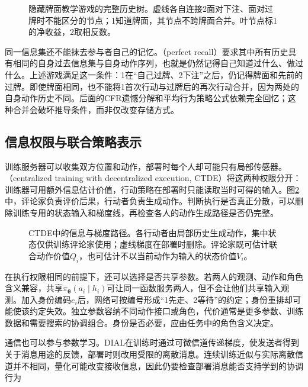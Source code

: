 \begin{figure}[htbp]
 \centering
 
 \caption{隐藏牌面教学游戏的完整历史树。虚线各自连接2面对下注、面对过牌时不能区分的节点；1知道牌面，其节点不跨牌面合并。叶节点标1的净收益，2取相反数。}
 \label{fig:rl-multi-agent-card-tree}
\end{figure}

同一信息集还不能抹去参与者自己的记忆。（perfect recall）要求其中所有历史具有相同的自身过去信息集与自身动作序列，也就是仍然记得自己知道过什么、做过什么。上述游戏满足这一条件：1在“自己过牌、2下注”之后，仍记得牌面和先前的过牌。即使牌面相同，也不能将1首次行动与过牌后的再次行动合并，因为两处的自身动作历史不同。后面的CFR遗憾分解和平均行为策略公式依赖完全回忆；这种合并会破坏推导条件，而非仅改变存储方式。

\subsection{信息权限与联合策略表示}
\label{sec:rl-multi-agent-permissions}

训练服务器可以收集双方位置和动作，部署时每个人却可能只有局部传感器。（centralized training with decentralized execution, CTDE）将这两种权限分开：训练器可用额外信息估计价值，行动策略在部署时只能读取当时可得的输入。图\ref{fig:rl-multi-agent-ctde}中，评论家负责评价后果，行动者负责生成动作。判断执行是否真正分散，可以删除训练专用的状态输入和梯度线，再检查各人的动作生成路径是否仍完整。

\begin{figure}[htbp]
 \centering
 
 \caption{CTDE中的信息与梯度路径。各行动者由局部历史生成动作，集中状态仅供训练评论家使用；虚线梯度在部署时删除。评论家既可估计联合动作价值$Q_i$，也可估计不以当前动作为输入的状态价值$V_i$。}
 \label{fig:rl-multi-agent-ctde}
\end{figure}

在执行权限相同的前提下，还可以选择是否共享参数。若两人的观测、动作和角色含义兼容，共享$\pi_{\bm\theta}(a_i\mid h_i)$可让同一函数服务两人，但不会让他们共享输入观测。加入身份编码$e_i$后，网络可按编号形成“1先走、2等待”的约定；身份重排却可能使该约定失效。独立参数容纳不同动作接口或角色，代价通常是更多参数、训练数据和需要搜索的协调组合。身份是否必要，应由任务中的角色含义决定。

通信也可以参与参数学习。DIAL在训练时通过可微信道传递梯度，使发送者得到关于消息用途的反馈，部署时则改用受限的离散消息。连续训练近似与实际离散信道并不相同，量化可能改变接收信息，因此仍要检查部署消息能否支持学到的协调行为

